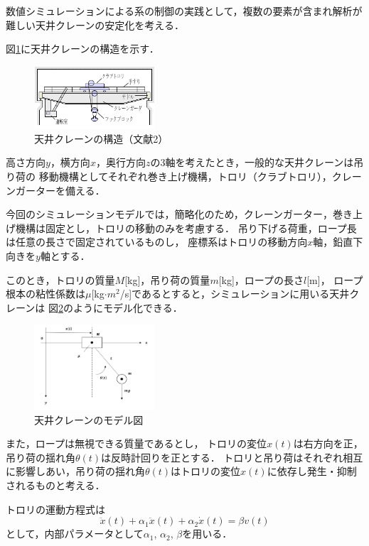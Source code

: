 \documentclass[dvipdfmx,titlepage,a4j]{jsarticle}  %
\begin{document}
数値シミュレーションによる系の制御の実践として，複数の要素が含まれ解析が難しい天井クレーンの安定化を考える．

図\ref{fig:crane}に天井クレーンの構造を示す．

\begin{figure}[htbp]
  \centering
  \includegraphics[width=0.4\textwidth]{../graph/crane.png}
  \caption{天井クレーンの構造（文献2）}
  \label{fig:crane}
\end{figure}


高さ方向$y$，横方向$x$，奥行方向$z$の3軸を考えたとき，一般的な天井クレーンは吊り荷の
移動機構としてそれぞれ巻き上げ機構，トロリ（クラブトロリ），クレーンガーターを備える．

今回のシミュレーションモデルでは，簡略化のため，クレーンガーター，巻き上げ機構は固定とし，トロリの移動のみを考慮する．
吊り下げる荷重，ロープ長は任意の長さで固定されているものし，
座標系はトロリの移動方向$x$軸，鉛直下向きを$y$軸とする．

このとき，トロリの質量$M$[kg]，吊り荷の質量$m$[kg]，ロープの長さ$l$[m]，
ロープ根本の粘性係数は$\mu$[kg$\cdot m^2$/s]であるとすると，シミュレーションに用いる天井クレーンは
図\ref{fig:crane-po}のようにモデル化できる．

\begin{figure}[htbp]
  \centering
  \includegraphics[width=0.4\textwidth]{../graph/ex-po.png}
  \caption{天井クレーンのモデル図}
  \label{fig:crane-po}
\end{figure}

また，ロープは無視できる質量であるとし，
トロリの変位$x(t)$は右方向を正，吊り荷の揺れ角$\theta(t)$は反時計回りを正とする．
トロリと吊り荷はそれぞれ相互に影響しあい，吊り荷の揺れ角$\theta(t)$はトロリの変位$x(t)$に依存し発生・抑制されるものと考える．

トロリの運動方程式は
\begin{equation}
  \ddot x(t) + \alpha_1 \ddot x(t)+ \alpha_2 \dot x(t) = \beta v(t) \nonumber
\end{equation}
として，内部パラメータとして$\alpha_1$, $\alpha_2$, $\beta$を用いる．
\end{document}
